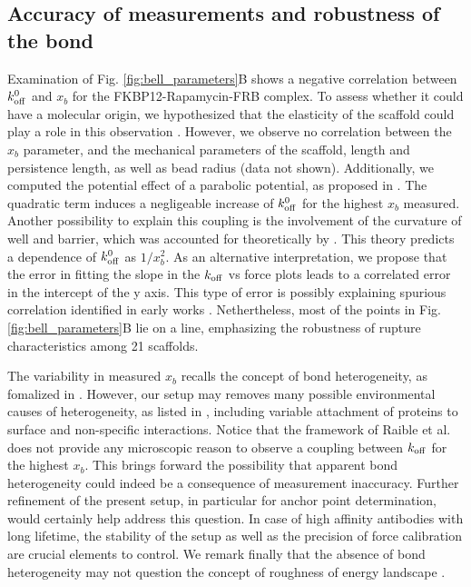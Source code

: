 \documentclass{biophys-new}
\begin{document}
\subsection*{Accuracy of measurements and robustness of the bond}

Examination of Fig. \ref{fig:bell_parameters}B shows a negative correlation between $k^0_{\rm off}$ and $x_b$ for the FKBP12-Rapamycin-FRB complex. To assess whether it could have a molecular origin, we hypothesized that the elasticity of the scaffold could play a role in this observation \cite{walton2008}. However, we observe no correlation between the $x_b$ parameter, and the mechanical parameters of the scaffold, length and persistence length, as well as bead radius (data not shown). Additionally, we computed the potential effect of a parabolic potential, as proposed in \cite{friddle2012}. The quadratic term induces a negligeable increase of $k^0_{\rm off}$ for the highest $x_b$ measured. Another possibility to explain this coupling is the involvement of the curvature of well and barrier, which was accounted for theoretically by \cite{bullerjahn2014}. This theory predicts a dependence of $k^0_{\rm off}$ as $1/x_b^2$. As an alternative interpretation, we propose that the error in fitting the slope in the $k_{\rm off}$ vs force plots leads to a correlated error in the intercept of the y axis. This type of error is possibly explaining spurious correlation identified in early works \cite{schwesinger2000}. Nethertheless, most of the points in Fig. \ref{fig:bell_parameters}B lie on a line, emphasizing the robustness of rupture characteristics among 21 scaffolds.

The variability in measured $x_b$ recalls the concept of bond heterogeneity, as fomalized in \cite{raible2006}. However, our setup may removes many possible environmental causes of heterogeneity, as listed in \cite{raible2006}, including variable attachment of proteins to surface and non-specific interactions. Notice that the framework of Raible et al. does not provide any microscopic reason to observe a coupling between $k_{\rm off}$ for the highest $x_b$. This brings forward the possibility that apparent bond heterogeneity could indeed be a consequence of measurement inaccuracy. Further refinement of the present setup, in particular for anchor point determination, would certainly help address this question.
In case of high affinity antibodies with long lifetime, the stability of the setup as well as the precision of force calibration are crucial elements to control.
We remark finally that the absence of bond heterogeneity may not question the concept of roughness of energy landscape \cite{rico2007, robert2011, limozin2016}.
\end{document}

